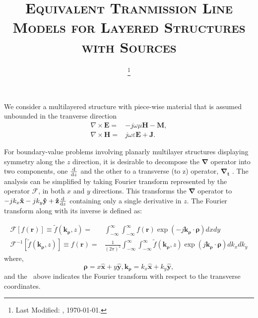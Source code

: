 \documentclass[11pt]{article}
\newcommand{\v}[1]{\mathbf{#1}} %
\newcommand{\t}[1]{\tilde{#1}} %
\renewcommand{\w}{\omega}  %
\renewcommand{\e}{\varepsilon}  %
\renewcommand{\u}{\mu}  %
\renewcommand{\p}{\rho}  %
\begin{document}
  \title{\textsc{Equivalent Tranmission Line Models for Layered Structures with Sources}\\}
  \date{\footnote{Last Modified: \currenttime, \today.}}
  \maketitle
  We consider a multilayered structure with piece-wise material that is assumed unbounded in the tranverse direction
  \begin{subequations}
    \begin{align}
      \nabla\times{\v E} ={}& -j \w \u \v{H} -\v{M},
      \label{eq:E}\\
      \nabla\times{\v H} ={}& j \w \e \v{E} + \v{J}.
      \label{eq:H}
    \end{align}
    \label{eq:MaxE}
  \end{subequations}

  For boundary-value problems involving planarly multilayer structures displaying symmetry along the $z$ direction, it is desirable to decompose the $\v{\nabla}$ operator into two components, one $\dv{}{z}$ and the other to a transverse (to z) operator, $\v{\nabla_t}$ \cite[p. 64]{felsen1994radiation}. The analysis can be simplified by taking Fourier transform represented by the operator $\mathcal{F}$, in both $x$ and $y$ directions. This transforms the $\v{\nabla}$ operator to $-j k_x \v{\hat{x}} - j k_y \v{\hat{y}} + \v{\hat{z}}\dv{}{z}$ containing only a single derivative in $z$.
  The Fourier transform along with its inverse is defined as:

  \begin{subequations}
    \begin{align}
      \mathcal{F}[f(\v{r})] \equiv \t{f}(\v{k_{\p}},z) ={}& \int_{-\infty}^{\infty} \int_{-\infty}^{\infty}
      f(\v{r}) \exp(-j \v{k_{\p}} \cdot \v{\p}) dx dy
      \label{eq:Fourier}\\
      \mathcal{F}^{-1}[\t{f}(\v{k_{\p}},z)] \equiv f(\v{r}) ={}& \frac{1}{(2\pi)^2} \int_{-\infty}^{\infty} \int_{-\infty}^{\infty} \t{f}(\v{k_{\p}},z)
      \exp(j \v{k_{\p}} \cdot \v{\p}) dk_x dk_y
      \label{eq:IFourier}
    \end{align}
    \label{eq:FT}
  \end{subequations}
  where,
  \begin{equation}
    \v{\p} = x\v{\hat{x}} + y\v{\hat{y}},
    \v{k_{\p}} = k_x\v{\hat{x}} + k_y\v{\hat{y}},
  \end{equation}
  and the $~$ above indicates the Fourier transform with respect to the transverse coordinates.
\end{document}
